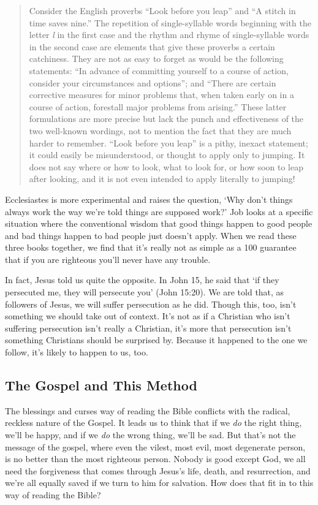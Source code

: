 \begin{quote}
    Consider the English proverbs “Look before you leap” and “A stitch in time
    saves nine.” The repetition of single-syllable words beginning with the
    letter \textit{l} in the first case and the rhythm and rhyme of
    single-syllable words in the second case are elements that give these
    proverbs a certain catchiness. They are not as easy to forget as would be
    the following statements: “In advance of committing yourself to a course of
    action, consider your circumstances and options”; and “There are certain
    corrective measures for minor problems that, when taken early on in a course
    of action, forestall major problems from arising.” These latter formulations
    are more precise but lack the punch and effectiveness of the two well-known
    wordings, not to mention the fact that they are much harder to remember.
    “Look before you leap” is a pithy, inexact statement; it could easily be
    misunderstood, or thought to apply only to jumping. It does not say where or
    how to look, what to look for, or how soon to leap after looking, and it is
    not even intended to apply literally to jumping!
\end{quote}

Ecclesiastes is more experimental and raises the question, `Why don't things
always work the way we're told things are supposed work?' Job looks at a
specific situation where the conventional wisdom that good things happen to good
people and bad things happen to bad people just doesn't apply. When we read
these three books together, we find that it's really not as simple as a 100%
guarantee that if you are righteous you'll never have any trouble.

In fact, Jesus told us quite the opposite. In John 15, he said that `if they
persecuted me, they will persecute you' (John 15:20). We are told that, as
followers of Jesus, we will suffer persecution as he did. Though this, too,
isn't something we should take out of context. It's not as if a Christian who
isn't suffering persecution isn't really a Christian, it's more that persecution
isn't something Christians should be surprised by. Because it happened to the
one we follow, it's likely to happen to us, too.

\subsection{The Gospel and This Method}

The blessings and curses way of reading the Bible conflicts with the radical,
reckless nature of the Gospel. It leads us to think that if we \textit{do} the
right thing, we'll be happy, and if we \textit{do} the wrong thing, we'll be
sad. But that's not the message of the gospel, where even the vilest, most evil,
most degenerate person, is no better than the most righteous person. Nobody is
good except God, we all need the forgiveness that comes through Jesus's life,
death, and resurrection, and we're all equally saved if we turn to him for
salvation. How does that fit in to this way of reading the Bible?

